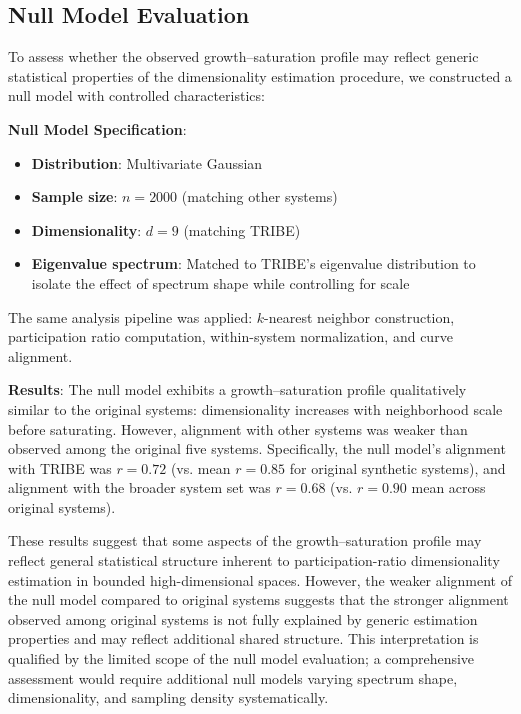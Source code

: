 \subsection{Null Model Evaluation}

To assess whether the observed growth--saturation profile may reflect generic statistical properties of the dimensionality estimation procedure, we constructed a null model with controlled characteristics:

\textbf{Null Model Specification}:
\begin{itemize}
	\item \textbf{Distribution}: Multivariate Gaussian
	\item \textbf{Sample size}: $n = 2000$ (matching other systems)
	\item \textbf{Dimensionality}: $d = 9$ (matching TRIBE)
	\item \textbf{Eigenvalue spectrum}: Matched to TRIBE's eigenvalue distribution to isolate the effect of spectrum shape while controlling for scale
\end{itemize}

The same analysis pipeline was applied: $k$-nearest neighbor construction, participation ratio computation, within-system normalization, and curve alignment.

\textbf{Results}:
The null model exhibits a growth--saturation profile qualitatively similar to the original systems: dimensionality increases with neighborhood scale before saturating. However, alignment with other systems was weaker than observed among the original five systems. Specifically, the null model's alignment with TRIBE was $r = 0.72$ (vs. mean $r = 0.85$ for original synthetic systems), and alignment with the broader system set was $r = 0.68$ (vs. $r = 0.90$ mean across original systems).

These results suggest that some aspects of the growth--saturation profile may reflect general statistical structure inherent to participation-ratio dimensionality estimation in bounded high-dimensional spaces. However, the weaker alignment of the null model compared to original systems suggests that the stronger alignment observed among original systems is not fully explained by generic estimation properties and may reflect additional shared structure. This interpretation is qualified by the limited scope of the null model evaluation; a comprehensive assessment would require additional null models varying spectrum shape, dimensionality, and sampling density systematically.

